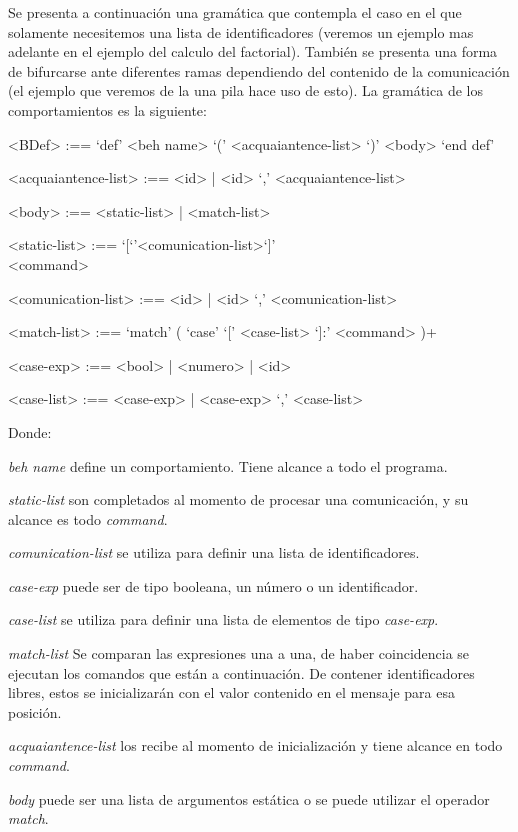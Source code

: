 Se presenta a continuación una gramática que contempla el caso en el que solamente necesitemos una lista de identificadores (veremos un ejemplo mas adelante en el ejemplo del calculo del factorial). También se presenta una forma de bifurcarse ante diferentes ramas dependiendo del contenido de la comunicación (el ejemplo que veremos de la una pila hace uso de esto). La gramática de los comportamientos es la siguiente:

\begin{grammar}
<BDef> :== `def' <beh name> `(' <acquaiantence-list> `)' <body> `end def'

<acquaiantence-list> :== <id> | <id> `,' <acquaiantence-list> 

<body> :== <static-list> | <match-list>

<static-list> :== `[`'<comunication-list>`]' \\ <command>

<comunication-list> :== <id> | <id> `,' <comunication-list>

<match-list> :==  `match' ( `case' `[' <case-list> `]:' <command> )+  

<case-exp> :== <bool> | <numero> | <id>  

<case-list> :== <case-exp> | <case-exp> `,' <case-list> 


\end{grammar}

Donde: 

\begin{description}
 \item \textit{beh name} define un comportamiento. Tiene alcance a todo el programa. 
 \item \textit{static-list} son completados al momento de procesar una comunicación, y su alcance es todo \textit{command}. 
 \item \textit{comunication-list} se utiliza para definir una lista de identificadores.
 \item \textit{case-exp} puede ser de tipo booleana, un número o un identificador. 
 \item \textit{case-list} se utiliza para definir una lista de elementos de tipo \textit{case-exp}.
 \item \textit{match-list} Se comparan las expresiones una a una, de haber coincidencia se ejecutan los comandos que están a continuación. De contener identificadores libres, estos se inicializarán con el valor contenido en el mensaje para esa posición.
 \item \textit{acquaiantence-list} los recibe al momento de inicialización y tiene alcance en todo \textit{command}.
 \item \textit{body} puede ser una lista de argumentos estática o se puede utilizar el operador \textit{match}.
\end{description}

